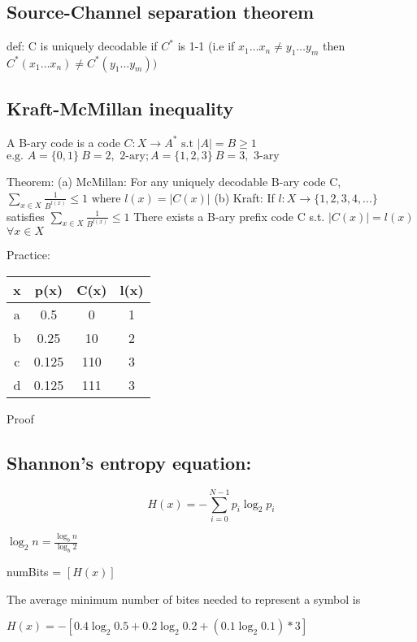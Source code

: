 \documentclass{article}
\begin{document}
\subsection{Source-Channel separation theorem}

def: C is uniquely decodable if $C^*$ is 1-1
(i.e if $x_1 \dots x_n \ne y_1 \dots y_m$ then $C^*(x_1 \dots x_n) \ne C^*(y_1 \dots y_m))$

\subsection{Kraft-McMillan inequality}

A B-ary code is a code $ C : X \to A^* \text{ s.t } |A| = B \ge 1$
$ \text{e.g. } A = \{0, 1\} \: B = 2, \text{ 2-ary}; A = \{ 1, 2, 3 \} \: B = 3, \text{ 3-ary}$

Theorem:
(a) McMillan: For any uniquely decodable B-ary code C,
$\sum_{x\in X} \frac{1}{B^{l(x)}} \le 1 \text{ where } l(x) = |C(x)|$
(b) Kraft: If $ l: X \to \{1, 2, 3, 4, ...\}$ satisfies $\sum_{x \in X} \frac{1}{B^{l(x)}} \le 1$
There exists a B-ary prefix code C s.t. $ |C(x)| = l(x)$   $ \forall x \in X$


Practice: 

\begin{tabular}{| c | c | c | c |}
    \hline 
    x   & p(x) & C(x) & l(x) \\ \hline
    a   & 0.5  & 0    & 1    \\ \hline
    b   & 0.25 & 10   & 2    \\ \hline
    c   & 0.125& 110  & 3    \\ \hline
    d   & 0.125& 111  & 3    \\ \hline
\end{tabular}


Proof




\subsection{Shannon's entropy equation:}

\[
    H(x) = -\sum_{i=0}^{N-1} p_i\log_2{p_i}
\]

$\log_2{n} = \frac{\log_b{n}}{\log_b{2}}$

numBits = $[H(x)]$


The average minimum number of bites needed to represent a symbol is 

$H(x) = -[0.4\log_2{0.5} + 0.2\log_2{0.2}+ (0.1\log_2{0.1}) * 3]$
\end{document}
